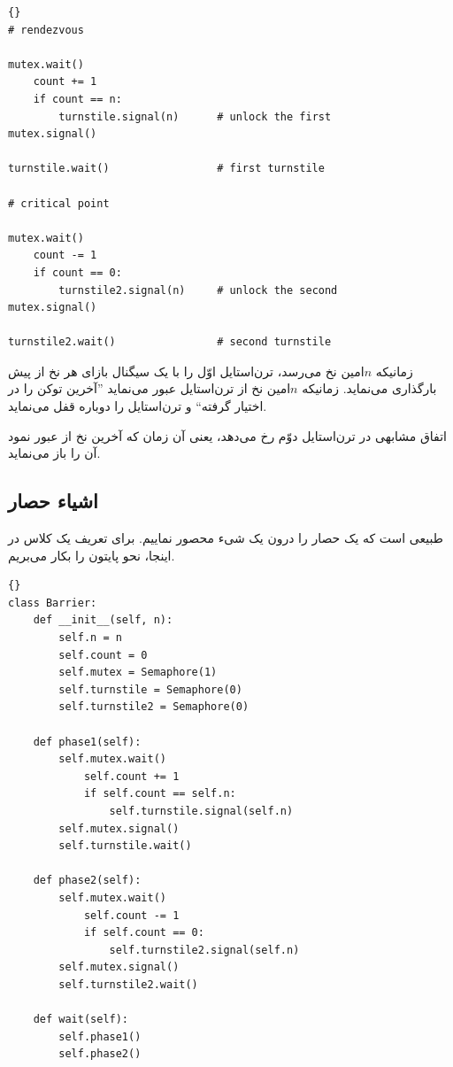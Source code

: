 \documentclass{book}
\begin{document}
\begin{latin}
\begin{lstlisting}[title=\rl{راه حل حصار با قابلیت استفادهٔ مجدد}]{}
# rendezvous

mutex.wait()
    count += 1
    if count == n:
        turnstile.signal(n)      # unlock the first
mutex.signal()

turnstile.wait()                 # first turnstile

# critical point

mutex.wait()
    count -= 1
    if count == 0:
        turnstile2.signal(n)     # unlock the second
mutex.signal()

turnstile2.wait()                # second turnstile
\end{lstlisting}
\end{latin}

    زمانیکه $n$امین نخ می‌رسد، ترن‌استایل اوّل را با یک سیگنال بازای هر نخ از پیش بارگذاری می‌نماید.
    زمانیکه $n$امین نخ از ترن‌استایل عبور می‌نماید ''آخرین توکن را در اختیار گرفته`` و ترن‌استایل را دوباره قفل می‌نماید. 
    

    اتفاق مشابهی در ترن‌استایل دوّم  رخ می‌دهد،  یعنی آن زمان که آخرین نخ از  عبور نمود آن را باز می‌نماید. 

\newpage
\subsection {اشیاء حصار}

    طبیعی است که یک حصار را درون یک شیء محصور نماییم. 
    برای تعریف یک کلاس در اینجا، نحو پایتون را بکار می‌بریم. 

\begin{latin}
\begin{lstlisting}[title=\rl{کلاس \lr{Barrier} }]{}
class Barrier:
    def __init__(self, n):
        self.n = n
        self.count = 0
        self.mutex = Semaphore(1)
        self.turnstile = Semaphore(0)
        self.turnstile2 = Semaphore(0)

    def phase1(self):
        self.mutex.wait()
            self.count += 1
            if self.count == self.n:
                self.turnstile.signal(self.n) 
        self.mutex.signal()
        self.turnstile.wait()            

    def phase2(self):
        self.mutex.wait()
            self.count -= 1
            if self.count == 0:
                self.turnstile2.signal(self.n)
        self.mutex.signal()
        self.turnstile2.wait()

    def wait(self):
        self.phase1()
        self.phase2()
\end{lstlisting}
\end{latin}
\end{document}
